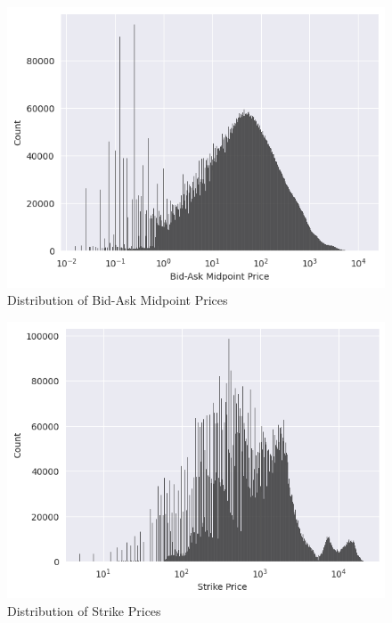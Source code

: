 \documentclass[a4paper]{article}
\begin{document}
\begin{multicols}{2}
  \begin{figure}[H]
    \centering
    \includegraphics[width=\linewidth]{01_midpoint_dist.png}
    \caption{Distribution of Bid-Ask Midpoint Prices}
    \label{fig:01_midpoint_dist}
  \end{figure}
  
  \begin{figure}[H]
    \centering
    \includegraphics[width=\linewidth]{02_strike_price_dist.png}
    \caption{Distribution of Strike Prices}
    \label{fig:02_strike_price}
  \end{figure}
\end{multicols}
\end{document}
